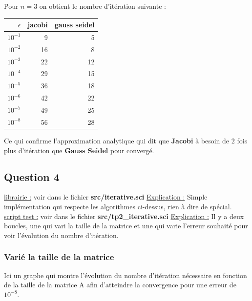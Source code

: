\documentclass[11pt]{article}
\begin{document}
Pour $n = 3$ on obtient le nombre d'itération suivante :

\begin{center}
  \begin{tabular}{|r|r|r|}
    \hline
    $\epsilon$ & jacobi & gauss seidel \\ \hline
    $10^{-1}$ & 9 & 5 \\ \hline
    $10^{-2}$ & 16 & 8 \\ \hline
    $10^{-3}$ & 22 & 12 \\ \hline
    $10^{-4}$ & 29 & 15 \\ \hline
    $10^{-5}$ & 36 & 18 \\ \hline
    $10^{-6}$ & 42 & 22 \\ \hline
    $10^{-7}$ & 49 & 25 \\ \hline
    $10^{-8}$ & 56 & 28 \\ \hline
  \end{tabular}
\end{center}

Ce qui confirme l'approximation analytique qui dit que \textbf{Jacobi}
à besoin de 2 fois plus d'itération que \textbf{Gauss Seidel} pour
convergé.

\subsection{Question 4}

\underline{librairie :} voir dans le fichier
\textbf{src/iterative.sci}\newline
\underline{Explication :}\newline
Simple implémentation qui respecte les algorithmes ci-dessus, rien à
dire de spécial.\newline
\vspace{5mm}
\underline{script test :} voir dans le fichier
\textbf{src/tp2\_iterative.sci}\newline
\underline{Explication :}\newline
Il y a deux boucles, une qui vari la taille de la matrice et une qui
varie l'erreur souhaité pour voir l'évolution du nombre d'itération.

\subsubsection{Varié la taille de la matrice}

Ici un graphe qui montre l'évolution du nombre d'itération nécessaire
en fonction de la taille de la matrice A afin d'atteindre la
convergence pour une erreur de $10^{-8}$.
\end{document}
